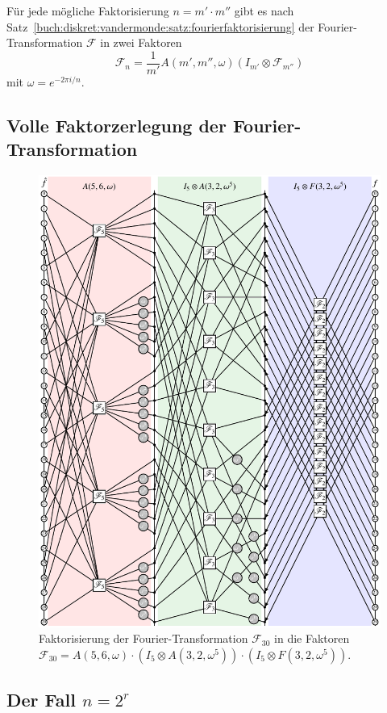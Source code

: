 Für jede mögliche Faktorisierung $n=m'\cdot m''$ gibt es nach
Satz~\ref{buch:diskret:vandermonde:satz:fourierfaktorisierung}
der Fourier-Transformation $\mathscr{F}$ in zwei Faktoren
\[
\mathscr{F}_n
=
\frac{1}{m'} A(m',m'',\omega) (I_{m'}\otimes \mathscr{F}_{m''})
\]
mit $\omega=e^{-2\pi i/n}$.

%
%
\subsection{Volle Faktorzerlegung der Fourier-Transformation
\label{buch:diskret:schnell:subsection:fourierfaktorisierung}}
\begin{figure}
\centering
\includegraphics{chapters/060-diskret/images/f30.pdf}
\caption{Faktorisierung der Fourier-Transformation
$\mathscr{F}_{30}$ in die Faktoren
$\mathscr{F}_{30}=A(5,6,\omega)\cdot (I_5\otimes A(3,2,\omega^5))\cdot (I_5\otimes F(3,2,\omega^5))$.
\label{buch:diskret:faktorisierung:fig:f30}}
\end{figure}


%
%
\subsection{Der Fall $n=2^r$
\label{buch:diskret:schnell:subsection:n=2r}}




